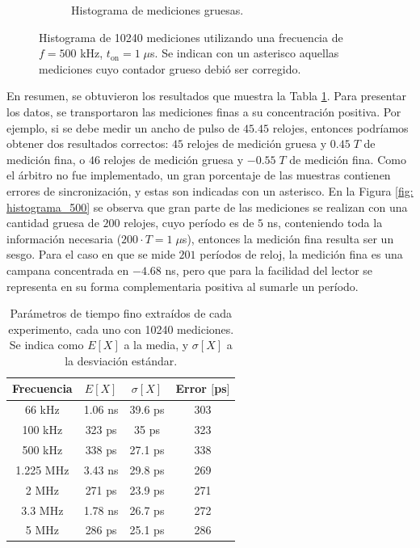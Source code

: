 \begin{figure}[H]
\begin{subfigure}[t]{0.45\textwidth}
{           }
           \caption{Histograma de mediciones gruesas.}
     \end{subfigure}
     \caption{Histograma de 10240 mediciones utilizando una frecuencia de $f=500$ kHz, $t_{\text{on}}=1 \; \mu$s. 
     Se indican con un asterisco aquellas mediciones cuyo contador grueso debió ser corregido.}
\end{figure}


En resumen, se obtuvieron los resultados que muestra la Tabla \ref{tabla: res_med_1}. Para presentar los datos, se
transportaron las mediciones finas a su concentración positiva. Por ejemplo, si se debe medir un ancho de pulso
de $45.45$ relojes, entonces podríamos obtener dos resultados correctos: $45$ relojes de medición gruesa y $0.45 \; T$
de medición fina, o $46$ relojes de medición gruesa y $-0.55 \; T$ de medición fina. Como el árbitro no fue
implementado, un gran porcentaje de las muestras contienen errores de sincronización, y estas son indicadas
con un asterisco. En la Figura \ref{fig: histograma_500} se observa que gran parte de las mediciones
se realizan con una cantidad gruesa de $200$ relojes, cuyo período es de $5$ ns, conteniendo toda 
la información necesaria ($200 \cdot T = 1 \; \mu$s), entonces la medición fina resulta ser un sesgo. Para el caso en que se mide
$201$ períodos de reloj, la medición fina es una campana concentrada en $-4.68$ ns, pero que para la facilidad del lector
se representa en su forma complementaria positiva al sumarle un período.

\begin{table}[!htpb]
     \centering
     \begin{tabular}{cccc}
     \hline
     Frecuencia         & $E[X]$   & $ \sigma[X]$ & Error $[$ps$]$ \\ \hline
     66 kHz             & 1.06 ns  & 39.6 ps      & 303            \\ \hline
     100 kHz            & 323 ps   & 35 ps        & 323            \\ \hline
     500 kHz            & 338 ps   & 27.1 ps      & 338            \\ \hline
     1.225 MHz          & 3.43 ns  & 29.8 ps      & 269            \\ \hline
     2 MHz              & 271 ps   & 23.9 ps      & 271            \\ \hline
     3.3 MHz            & 1.78 ns  & 26.7 ps      & 272            \\ \hline
     5 MHz              & 286 ps   & 25.1 ps      & 286            \\ \hline
     \end{tabular}
     \caption{Parámetros de tiempo fino extraídos de cada experimento, cada uno con 10240 mediciones.
     Se indica como $E[X]$ a la media, y $\sigma[X]$ a la desviación estándar.}
     \label{tabla: res_med_1}
\end{table}


